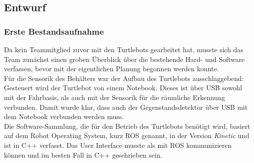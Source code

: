 \documentclass[a4paper,12pt,headsepline]{scrartcl}
\begin{document}
		
	
	\subsection{Entwurf}
	\subsubsection{Erste Bestandsaufnahme}
		Da kein Teammitglied zuvor mit den Turtlebots gearbeitet hat, musste sich das Team zunächst einen groben Überblick über die bestehende Hard- und Software verfassen, bevor mit der eigentlichen Planung begonnen werden konnte.\\
		Für die Sensorik des Behälters war der Aufbau des Turtlebots ausschlaggebend: Gesteuert wird der Turtlebot von einem Notebook. Dieses ist über USB sowohl mit der Fahrbasis, als auch mit der Sensorik für die räumliche Erkennung verbunden. Damit wurde klar, dass auch der Gegenstandsdetektor über USB mit dem Notebook verbunden werden muss. \\
		Die Software-Sammlung, die für den Betrieb des Turtlebots benötigt wird, basiert auf dem \glqq Robot Operating System\grqq , kurz ROS genannt, in der Version \textit{Kinetic} und ist in C++ verfasst. Das User Interface musste als mit ROS kommunizieren können und im besten Fall in C++ geschrieben sein.
\end{document}
